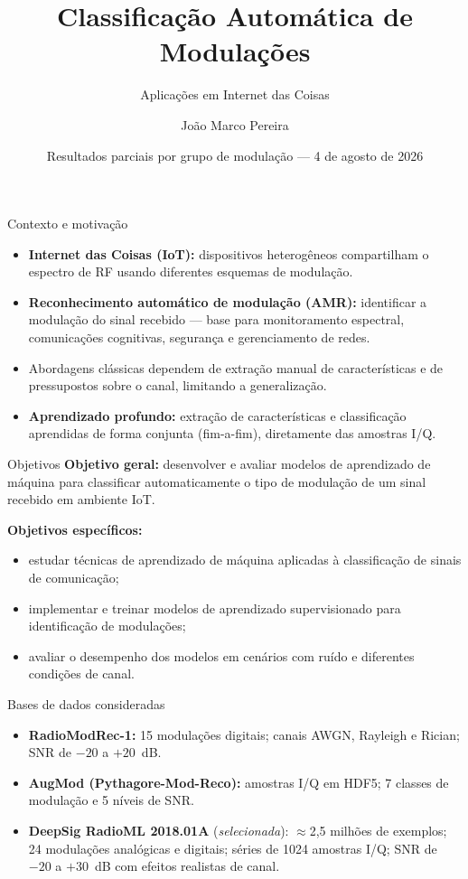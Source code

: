 \documentclass[aspectratio=169,11pt]{beamer}
\title{Classificação Automática de Modulações}
\subtitle{Aplicações em Internet das Coisas}
\author{João Marco Pereira}
\institute{CEFET/RJ}
\date{Resultados parciais por grupo de modulação --- 4 de agosto de 2026}
\begin{document}
\begin{frame}
  \titlepage
\end{frame}

\begin{frame}{Contexto e motivação}
  \begin{itemize}\setlength{\itemsep}{2mm}
    \item \textbf{Internet das Coisas (IoT):} dispositivos heterogêneos compartilham o espectro de RF usando diferentes esquemas de modulação.
    \item \textbf{Reconhecimento automático de modulação (AMR):} identificar a modulação do sinal recebido --- base para monitoramento espectral, comunicações cognitivas, segurança e gerenciamento de redes.
    \item Abordagens clássicas dependem de extração manual de características e de pressupostos sobre o canal, limitando a generalização.
    \item \textbf{Aprendizado profundo:} extração de características e classificação aprendidas de forma conjunta (fim-a-fim), diretamente das amostras I/Q.
  \end{itemize}
\end{frame}

\begin{frame}{Objetivos}
  \textbf{Objetivo geral:} desenvolver e avaliar modelos de aprendizado de máquina para classificar automaticamente o tipo de modulação de um sinal recebido em ambiente IoT.
  \vspace{3mm}

  \textbf{Objetivos específicos:}
  \begin{itemize}\setlength{\itemsep}{2mm}
    \item estudar técnicas de aprendizado de máquina aplicadas à classificação de sinais de comunicação;
    \item implementar e treinar modelos de aprendizado supervisionado para identificação de modulações;
    \item avaliar o desempenho dos modelos em cenários com ruído e diferentes condições de canal.
  \end{itemize}
\end{frame}

\begin{frame}{Bases de dados consideradas}
  \begin{itemize}\setlength{\itemsep}{3mm}
    \item \textbf{RadioModRec-1:} 15 modulações digitais; canais AWGN, Rayleigh e Rician; SNR de $-20$ a $+20$~dB.
    \item \textbf{AugMod (Pythagore-Mod-Reco):} amostras I/Q em HDF5; 7 classes de modulação e 5 níveis de SNR.
    \item \textbf{DeepSig RadioML 2018.01A} (\emph{selecionada}): $\approx$2,5 milhões de exemplos; 24 modulações analógicas e digitais; séries de 1024 amostras I/Q; SNR de $-20$ a $+30$~dB com efeitos realistas de canal.
  \end{itemize}
\end{frame}
\end{document}
